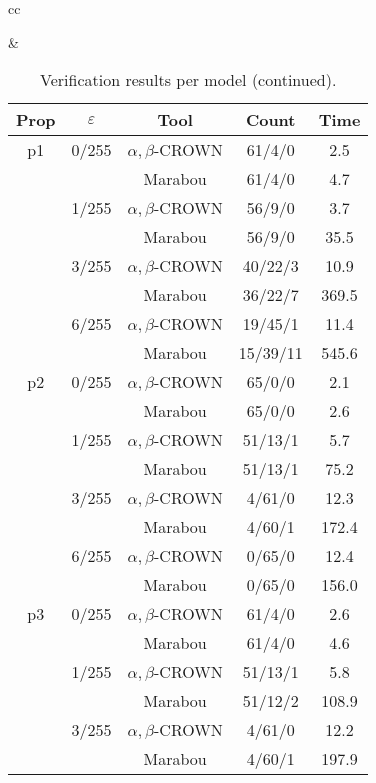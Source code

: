 \begin{table*}[htbp]
\centering
\caption{Verification results per model (continued).}
\setlength{\tabcolsep}{6pt}
\renewcommand{\arraystretch}{1.1}
\begin{tabular}{cc}

 & \\
\begin{minipage}{0.48\linewidth}
\setlength{\extrarowheight}{0pt}
\begin{tabular}{|c|c|c|c|c|}
\hline
Prop & $\varepsilon$ & Tool & Count & Time\\
\hline
p1 & 0/255 & $\alpha, \beta$-CROWN & 61/4/0 & 2.5 \\
 &  & Marabou & 61/4/0 & 4.7 \\
\cline{2-5}
 & 1/255 & $\alpha, \beta$-CROWN & 56/9/0 & 3.7 \\
 &  & Marabou & 56/9/0 & 35.5 \\
\cline{2-5}
 & 3/255 & $\alpha, \beta$-CROWN & 40/22/3 & 10.9 \\
 &  & Marabou & 36/22/7 & 369.5 \\
\cline{2-5}
 & 6/255 & $\alpha, \beta$-CROWN & 19/45/1 & 11.4 \\
 &  & Marabou & 15/39/11 & 545.6 \\
\cline{2-5}
\hline
p2 & 0/255 & $\alpha, \beta$-CROWN & 65/0/0 & 2.1 \\
 &  & Marabou & 65/0/0 & 2.6 \\
\cline{2-5}
 & 1/255 & $\alpha, \beta$-CROWN & 51/13/1 & 5.7 \\
 &  & Marabou & 51/13/1 & 75.2 \\
\cline{2-5}
 & 3/255 & $\alpha, \beta$-CROWN & 4/61/0 & 12.3 \\
 &  & Marabou & 4/60/1 & 172.4 \\
\cline{2-5}
 & 6/255 & $\alpha, \beta$-CROWN & 0/65/0 & 12.4 \\
 &  & Marabou & 0/65/0 & 156.0 \\
\cline{2-5}
\hline
p3 & 0/255 & $\alpha, \beta$-CROWN & 61/4/0 & 2.6 \\
 &  & Marabou & 61/4/0 & 4.6 \\
\cline{2-5}
 & 1/255 & $\alpha, \beta$-CROWN & 51/13/1 & 5.8 \\
 &  & Marabou & 51/12/2 & 108.9 \\
\cline{2-5}
 & 3/255 & $\alpha, \beta$-CROWN & 4/61/0 & 12.2 \\
 &  & Marabou & 4/60/1 & 197.9 \\

\end{tabular}
\end{minipage}
\end{tabular}
\end{table*}
